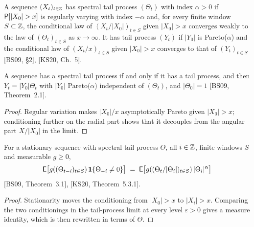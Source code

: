 \begin{definition}
  \label{def:tail-process}
  \leanok
  A sequence $(X_t)_{t \in \mathbb{Z}}$ has spectral tail process $(\Theta_t)$ with index $\alpha > 0$ if
  $\mathsf{P}[|X_0| > x]$ is regularly varying with index $-\alpha$ and, for every finite window
  $S \subset \mathbb{Z}$, the conditional law of $(X_t/|X_0|)_{t \in S}$ given $|X_0| > x$ converges weakly to
  the law of $(\Theta_t)_{t \in S}$ as $x \to \infty$. It has tail process $(Y_t)$ if $|Y_0|$ is
  Pareto($\alpha$) and the conditional law of $(X_t/x)_{t\in S}$ given $|X_0| > x$ converges to that of
  $(Y_t)_{t \in S}$ [BS09, \S2], [KS20, Ch.~5].
\end{definition}

\begin{theorem}
  \label{thm:basrak-segers}
  \leanok
  A sequence has a spectral tail process if and only if it has a tail process, and then
  $Y_t = |Y_0| \Theta_t$ with $|Y_0|$ Pareto($\alpha$) independent of $(\Theta_t)$, and $|\Theta_0| = 1$
  [BS09, Theorem~2.1].
\end{theorem}
\begin{proof}
  \leanok
  Regular variation makes $|X_0|/x$ asymptotically Pareto given $|X_0| > x$; conditioning further on
  the radial part shows that it decouples from the angular part $X/|X_0|$ in the limit.
\end{proof}

\begin{theorem}
  \label{thm:time-change}
  \leanok
  For a stationary sequence with spectral tail process $\Theta$, all $i \in \mathbb{Z}$, finite windows
  $S$ and measurable $g \ge 0$,
  \begin{align*}
    \mathsf{E}\big[ g((\Theta_{t-i})_{t\in S}) \, \mathbf 1\{\Theta_{-i} \ne 0\} \big]
      \; = \; \mathsf{E}\big[ g((\Theta_t / |\Theta_i|)_{t \in S}) \, |\Theta_i|^\alpha \big]
  \end{align*}
  [BS09, Theorem~3.1], [KS20, Theorem~5.3.1].
\end{theorem}
\begin{proof}
  \leanok
  Stationarity moves the conditioning from $|X_0| > x$ to $|X_i| > x$. Comparing the two
  conditionings in the tail-process limit at every level $\varepsilon > 0$ gives a measure identity,
  which is then rewritten in terms of $\Theta$.
\end{proof}

